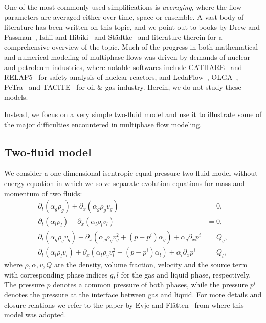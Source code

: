 One of the most commonly used simplifications is \textit{averaging}, where the flow parameters are averaged either over time, space or ensemble. A vast body of literature has been written on this topic, and we point out to books by Drew and Passman~\cite{dre99}, Ishii and Hibiki~\cite{ish11} and St\"{a}dtke~\cite{sta06} and literature therein for a comprehensive overview of the topic. Much of the progress in both mathematical and numerical modeling of multiphase flows was driven by demands of nuclear and petroleum industries, where notable softwares include CATHARE~\cite{bar90} and RELAP5~\cite{car90} for safety analysis of nuclear reactors, and LedaFlow~\cite{dan11}, OLGA~\cite{ben91}, PeTra~\cite{lar97} and TACITE~\cite{pau94} for oil \& gas industry. Herein, we do not study these models. 

Instead, we focus on a very simple two-fluid model and use it to illustrate some of the major difficulties encountered in multiphase flow modeling.

\subsection{Two-fluid model}

We consider a one-dimensional isentropic equal-pressure two-fluid model without energy equation in which we solve separate evolution equations for mass and momentum of two fluids: 
\begin{subequations} \label{eq:TFM}
\begin{align} 
\partial_t (\alpha_g \rho_g) + \partial_x (\alpha_g \rho_g v_g) & = 0, \label{zom1} \\
\partial_t (\alpha_l \rho_l) + \partial_x (\alpha_l \rho_l v_l) & = 0, \\
\partial_t (\alpha_g \rho_g v_g) + \partial_x (\alpha_g \rho_g v_g^2+(p-p^i)\alpha_g) + \alpha_g \partial_x p^i & = Q_g, \\
\partial_t (\alpha_l \rho_l v_l) + \partial_x (\alpha_l \rho_v v_l^2+(p-p^i)\alpha_l) + \alpha_l \partial_x p^i & = Q_l, \label{zok2}
\end{align}
\end{subequations}
where $ \rho, \alpha, v, Q $ are the density, volume fraction, velocity and the source term with corresponding phase indices $ g,l $ for the gas and liquid phase, respectively. The pressure $ p $ denotes a common pressure of both phases, while the pressure $ p^i $ denotes the pressure at the interface between gas and liquid. For more details and closure relations we refer to the paper by Evje and Fl\aa{}tten~\cite{evj03} from where this model was adopted.

